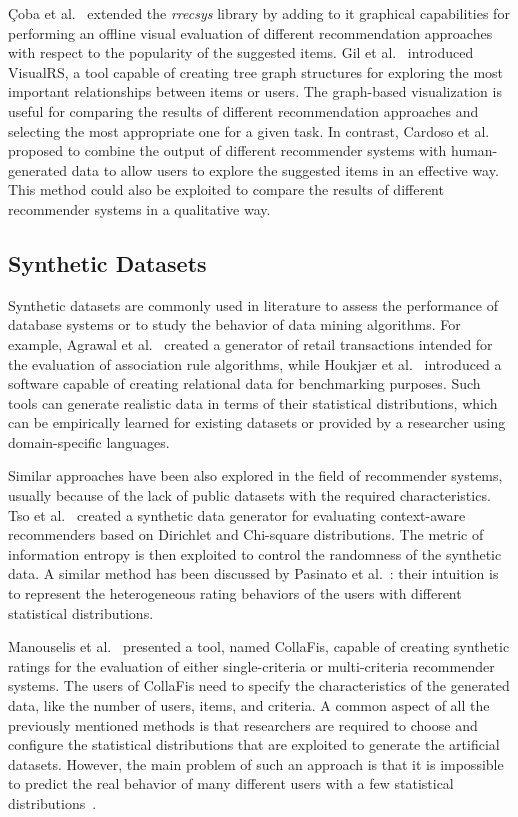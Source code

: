 \c{C}oba et al.~\cite{Coba2017} extended the \textit{rrecsys} library by adding to it graphical capabilities for performing an offline visual evaluation of different recommendation approaches with respect to the popularity of the suggested items. Gil et al.~\cite{Gil2018} introduced VisualRS, a tool capable of creating tree graph structures for exploring the most important relationships between items or users. The graph-based visualization is useful for comparing the results of different recommendation approaches and selecting the most appropriate one for a given task. In contrast, Cardoso et al.~\cite{Cardoso2019} proposed to combine the output of different recommender systems with human-generated data to allow users to explore the suggested items in an effective way. This method could also be exploited to compare the results of different recommender systems in a qualitative way.

\subsection{Synthetic Datasets}

Synthetic datasets are commonly used in literature to assess the performance of database systems or to study the behavior of data mining algorithms. For example, Agrawal et al.~\cite{Agrawal1994} created a generator of retail transactions intended for the evaluation of association rule algorithms, while Houkj{\ae}r et al.~\cite{Houkjaer2006} introduced a software capable of creating relational data for benchmarking purposes. Such tools can generate realistic data in terms of their statistical distributions, which can be empirically learned for existing datasets or provided by a researcher using domain-specific languages.

Similar approaches have been also explored in the field of recommender systems, usually because of the lack of public datasets with the required characteristics. Tso et al.~\cite{Tso2006} created a synthetic data generator for evaluating context-aware recommenders based on Dirichlet and Chi-square distributions. The metric of information entropy is then exploited to control the randomness of the synthetic data. A similar method has been discussed by Pasinato et al.~\cite{Pasinato2013}: their intuition is to represent the heterogeneous rating behaviors of the users with different statistical distributions.

Manouselis et al.~\cite{Manouselis2008} presented a tool, named CollaFis, capable of creating synthetic ratings for the evaluation of either single-criteria or multi-criteria recommender systems. The users of CollaFis need to specify the characteristics of the generated data, like the number of users, items, and criteria. A common aspect of all the previously mentioned methods is that researchers are required to choose and configure the statistical distributions that are exploited to generate the artificial datasets. However, the main problem of such an approach is that it is impossible to predict the real behavior of many different users with a few statistical distributions~\cite{Montaner2004}.

